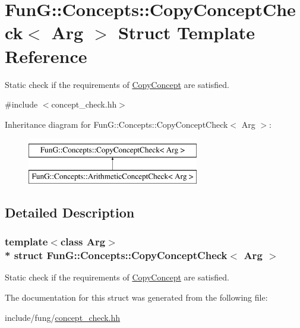 \hypertarget{structFunG_1_1Concepts_1_1CopyConceptCheck}{}\section{FunG\+:\+:Concepts\+:\+:Copy\+Concept\+Check$<$ Arg $>$ Struct Template Reference}
\label{structFunG_1_1Concepts_1_1CopyConceptCheck}


Static check if the requirements of \hyperlink{structFunG_1_1Concepts_1_1CopyConcept}{Copy\+Concept} are satisfied.  




{\ttfamily \#include $<$concept\+\_\+check.\+hh$>$}

Inheritance diagram for FunG\+:\+:Concepts\+:\+:Copy\+Concept\+Check$<$ Arg $>$\+:\begin{figure}[H]
\begin{center}
\leavevmode
\includegraphics[height=2.000000cm]{structFunG_1_1Concepts_1_1CopyConceptCheck}
\end{center}
\end{figure}


\subsection{Detailed Description}
\subsubsection*{template$<$class Arg$>$\\*
struct Fun\+G\+::\+Concepts\+::\+Copy\+Concept\+Check$<$ Arg $>$}

Static check if the requirements of \hyperlink{structFunG_1_1Concepts_1_1CopyConcept}{Copy\+Concept} are satisfied. 

The documentation for this struct was generated from the following file\+:\begin{DoxyCompactItemize}
\item 
include/fung/\hyperlink{concept__check_8hh}{concept\+\_\+check.\+hh}\end{DoxyCompactItemize}
